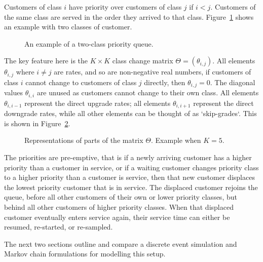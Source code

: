 \documentclass{article}
\begin{document}
Customers of class $i$ have priority over customers of class $j$ if $i < j$.
Customers of the same class are served in the order they arrived to that class.
Figure~\ref{fig:twoclass_example} shows an example with two classes of customer.

\begin{figure}
\begin{center}

\end{center}
\caption{An example of a two-class priority queue.}
\label{fig:twoclass_example}
\end{figure}

The key feature here is the $K \times K$ class change matrix
$\Theta = (\theta_{i,j})$. All elements $\theta_{i,j}$ where $i \neq j$ are
rates, and so are non-negative real numbers, if customers of class $i$ cannot
change to customers of class $j$ directly, then $\theta_{i,j} = 0$. The diagonal
values $\theta_{i,i}$ are unused as customers cannot change to their own class.
All elements $\theta_{i,i-1}$ represent the direct upgrade rates; all elements
$\theta_{i,i+1}$ represent the direct downgrade rates, while all other elements
can be thought of as `skip-grades`.
This is shown in Figure~\ref{fig:skipgrades}.

\begin{figure}
\begin{center}

\end{center}
\caption{Representations of parts of the matrix $\Theta$. Example when $K=5$.}
\label{fig:skipgrades}
\end{figure}

The priorities are pre-emptive, that is if a newly arriving customer has a
higher priority than a customer in service, or if a waiting customer changes
priority class to a higher priority than a customer is service, then that new
customer displaces the lowest priority customer that is in service. The
displaced customer rejoins the queue, before all other customers of their own or
lower priority classes, but behind all other customers of higher priority
classes. When that displaced customer eventually enters service again, their
service time can either be resumed, re-started, or re-sampled.

The next two sections outline and compare a discrete event simulation and
Markov chain formulations for modelling this setup.
\end{document}
